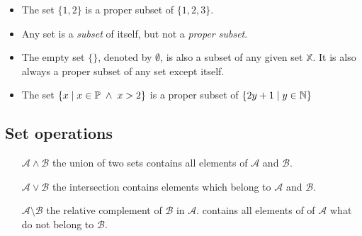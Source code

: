 \begin{example}
\begin{itemize}
	\item The set $\{1, 2 \}$ is a proper subset of $\{ 1, 2, 3 \}$.
	\item Any set is a {\em subset} of itself, but not a {\em proper subset}.
	\item The empty set $\{ \} $, denoted by $\emptyset $, is also a subset of any given set $\mathbb{X}$. It is also always a proper subset of any set except itself.
	\item The set $\{x\; | \; x\in\mathbb{P}\; \wedge\; x > 2 \}$ is a proper subset of 
	        $ \{ 2y+1 \; | \; y\in\mathbb{N} \}$
\end{itemize}
\end{example}

\subsection{Set operations}

\begin{itemize}
\item[$\mathcal{A} \wedge \mathcal{B}$ ] the union of two sets contains all elements of $\mathcal{A}$ and $\mathcal{B}$. 
\item[$\mathcal{A} \vee \mathcal{B}$ ] the intersection contains elements which belong to $\mathcal{A}$ and $\mathcal{B}$. 
\item[$\mathcal{A} \setminus \mathcal{B}$ ] the relative complement of $\mathcal{B}$ in $\mathcal{A}$. contains all elements of of $\mathcal{A}$ what do not belong to  $\mathcal{B}$. 




\end{itemize}